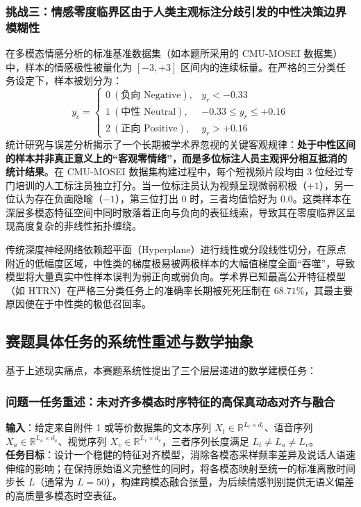 \subsubsection{挑战三：情感零度临界区由于人类主观标注分歧引发的中性决策边界模糊性}
在多模态情感分析的标准基准数据集（如本题所采用的 CMU-MOSEI 数据集\cite{zadeh2018multimodal}）中，样本的情感极性被量化为 $[-3, +3]$ 区间内的连续标量。在严格的三分类任务设定下，样本被划分为：
\begin{equation}
y_c = \begin{cases}
0 \ (\text{负向 Negative}), & y_r < -0.33 \\
1 \ (\text{中性 Neutral}), & -0.33 \le y_r \le +0.16 \\
2 \ (\text{正向 Positive}), & y_r > +0.16
\end{cases}
\end{equation}
统计研究与误差分析揭示了一个长期被学术界忽视的关键客观规律：\textbf{处于中性区间的样本并非真正意义上的“客观零情绪”，而是多位标注人员主观评分相互抵消的统计结果}。在 CMU-MOSEI 数据集构建过程中，每个短视频片段均由 3 位经过专门培训的人工标注员独立打分。当一位标注员认为视频呈现微弱积极（$+1$），另一位认为存在负面隐喻（$-1$），第三位打出 $0$ 时，三者均值恰好为 $0.0$。这类样本在深层多模态特征空间中同时散落着正向与负向的表征线索，导致其在零度临界区呈现高度复杂的非线性拓扑缠绕。

传统深度神经网络依赖超平面（Hyperplane）进行线性或分段线性切分，在原点附近的低幅度区域，中性类的梯度极易被两极样本的大幅值梯度全面“吞噬”，导致模型将大量真实中性样本误判为弱正向或弱负向。学术界已知最高公开特征模型（如 HTRN\cite{htrn2024}）在严格三分类任务上的准确率长期被死死压制在 $68.71\%$，其最主要原因便在于中性类的极低召回率。

\subsection{赛题具体任务的系统性重述与数学抽象}
基于上述现实痛点，本赛题系统性提出了三个层层递进的数学建模任务：

\subsubsection{问题一任务重述：未对齐多模态时序特征的高保真动态对齐与融合}
\textbf{输入}：给定来自附件 1 或等价数据集的文本序列 $X_t \in \mathbb{R}^{L_t \times d_t}$、语音序列 $X_a \in \mathbb{R}^{L_a \times d_a}$、视觉序列 $X_v \in \mathbb{R}^{L_v \times d_v}$，三者序列长度满足 $L_t \ne L_a \ne L_v$。\\
\textbf{任务目标}：设计一个稳健的特征对齐模型，消除各模态采样频率差异及说话人语速伸缩的影响；在保持原始语义完整性的同时，将各模态映射至统一的标准离散时间步长 $L$（通常为 $L=50$），构建跨模态融合张量，为后续情感判别提供无语义偏差的高质量多模态时空表征。

